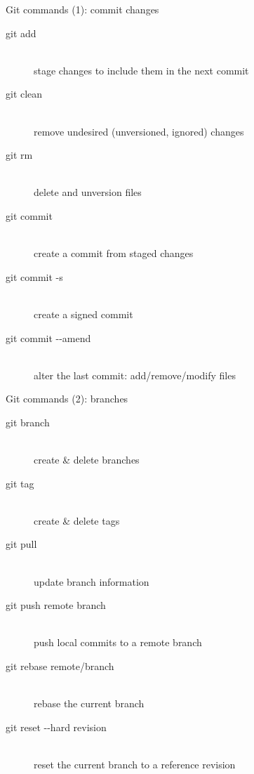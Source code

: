 \begin{frame}{Git commands (1): commit changes}
  \begin{description}
    \item[git add] \hfill \\
      stage changes to include them in the next commit
    \item[git clean] \hfill \\
      remove undesired (unversioned, ignored) changes
    \item[git rm] \hfill \\
      delete and unversion files
    \item[git commit] \hfill \\
      create a commit from staged changes
    \item[git commit -s] \hfill \\
      create a signed commit
    \item[git commit -{}-amend] \hfill \\
      alter the last commit: add/remove/modify files
  \end{description}
\end{frame}

\begin{frame}{Git commands (2): branches}
  \begin{description}
    \item[git branch] \hfill \\
      create \& delete branches
    \item[git tag] \hfill \\
      create \& delete tags
    \item[git pull] \hfill \\
      update branch information
    \item[git push remote branch] \hfill \\
      push local commits to a remote branch
    \item[git rebase remote/branch] \hfill \\
      rebase the current branch
    \item[git reset -{}-hard revision] \hfill \\
      reset the current branch to a reference revision
  \end{description}
\end{frame}

